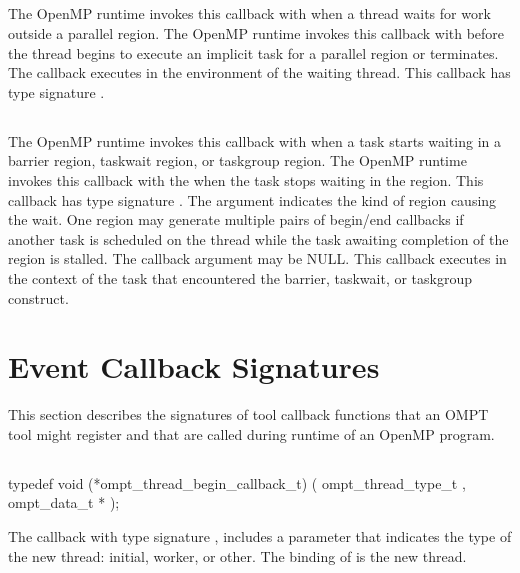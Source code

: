 \subsection{}
  The OpenMP runtime invokes this callback with  when a thread waits for work outside a parallel region.
  The OpenMP runtime invokes this callback with  before the thread  begins to execute an implicit task for
   a parallel region or terminates. The callback executes in the environment of the waiting thread.
  This callback has type signature .

\subsection{}

  The OpenMP runtime invokes this callback with  when a task starts waiting in a barrier region, taskwait region, or taskgroup region.
   The OpenMP runtime invokes this callback with the  when the task stops waiting in the region.
  This callback has type signature .
   The argument  indicates the kind of region causing the wait.
   One region may generate multiple pairs of begin/end callbacks if another task is scheduled on the thread while the task awaiting completion of the region is stalled.
   The callback argument  may be NULL.
   This callback executes in the context of the task that encountered the barrier, taskwait, or taskgroup construct.


\section{Event Callback Signatures}
\label{sec:ToolsSupport_callback_signatures}

This section describes the signatures of tool callback functions that an OMPT
tool might register and that are called during runtime of an OpenMP program.

\subsection{}
\label{subsec:ompt_thread_begin_callback_t}
\format
\begin{boxedcode}
typedef void (*ompt\_thread\_begin\_callback\_t) (
  ompt\_thread\_type\_t ,
  ompt\_data\_t *
);
\end{boxedcode}
\descr
The callback with type signature ,
includes a parameter 
that indicates the type of the new thread: initial, worker, or other.
The binding of  is the new thread.

